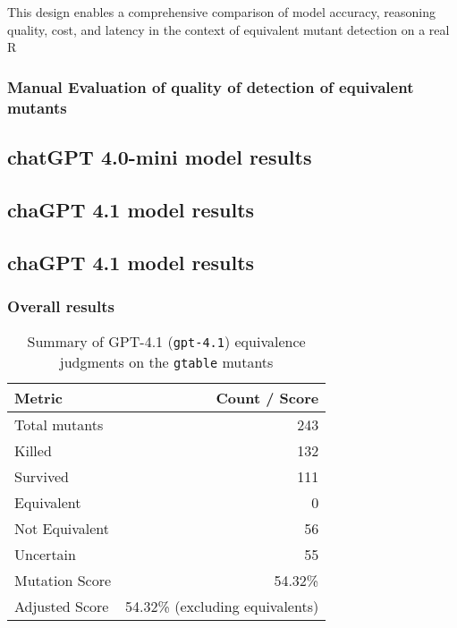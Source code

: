 This design enables a comprehensive comparison of model accuracy, reasoning quality, cost, and latency in the context of equivalent mutant detection on a real R

\subsubsection{Manual Evaluation of quality of detection of equivalent mutants}



\subsection{chatGPT 4.0-mini model results}

\subsection{chaGPT 4.1 model results}

\subsection{chaGPT 4.1 model results}

\subsubsection{Overall results}

\begin{table}[ht]
  \centering
  \begin{tabular}{lr}
    \toprule
    \textbf{Metric}            & \textbf{Count / Score}      \\
    \midrule
    Total mutants              & 243                          \\
    Killed                     & 132                          \\
    Survived                   & 111                          \\
    Equivalent                 &   0                          \\
    Not Equivalent             &  56                          \\
    Uncertain                  &  55                          \\
    Mutation Score             & 54.32\%                      \\
    Adjusted Score             & 54.32\% (excluding equivalents) \\
    \bottomrule
  \end{tabular}
  \caption{Summary of GPT-4.1 (\texttt{gpt-4.1}) equivalence judgments on the \texttt{gtable} mutants}
  \label{tab:gpt41-overall}
\end{table}

